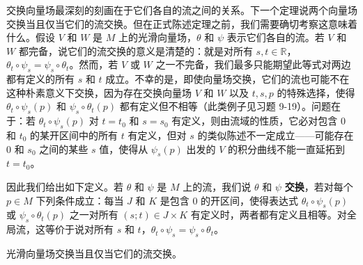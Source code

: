 \documentclass[../../main.tex]{subfiles}
\begin{document}
交换向量场最深刻的刻画在于它们各自的流之间的关系。下一个定理说两个向量场交换当且仅当它们的流交换。但在正式陈述定理之前，我们需要确切考察这意味着什么。假设 $V$ 和 $W$ 是 $M$ 上的光滑向量场，$\theta$ 和 $\psi$ 表示它们各自的流。若 $V$ 和 $W$ 都完备，说它们的流交换的意义是清楚的：就是对所有 $s,t\in\mathbb{R}$，$\theta_t\circ\psi_s=\psi_s\circ\theta_t$。然而，若 $V$ 或 $W$ 之一不完备，我们最多只能期望此等式对两边都有定义的所有 $s$ 和 $t$ 成立。不幸的是，即使向量场交换，它们的流也可能不在这种朴素意义下交换，因为存在交换向量场 $V$ 和 $W$ 以及 $t,s,p$ 的特殊选择，使得 $\theta_t\circ\psi_s(p)$ 和 $\psi_s\circ\theta_t(p)$ 都有定义但不相等（此类例子见习题 9-19）。问题在于：若 $\theta_t\circ\psi_s(p)$ 对 $t=t_0$ 和 $s=s_0$ 有定义，则由流域的性质，它必对包含 $0$ 和 $t_0$ 的某开区间中的所有 $t$ 有定义，但对 $s$ 的类似陈述不一定成立——可能存在 $0$ 和 $s_0$ 之间的某些 $s$ 值，使得从 $\psi_s(p)$ 出发的 $V$ 的积分曲线不能一直延拓到 $t=t_0$。

因此我们给出如下定义。若 $\theta$ 和 $\psi$ 是 $M$ 上的流，我们说 $\theta$ 和 $\psi$ \textbf{交换}，若对每个 $p\in M$ 下列条件成立：每当 $J$ 和 $K$ 是包含 $0$ 的开区间，使得表达式 $\theta_t\circ\psi_s(p)$ 或 $\psi_s\circ\theta_t(p)$ 之一对所有 $(s;t)\in J\times K$ 有定义时，两者都有定义且相等。对全局流，这等价于说对所有 $s$ 和 $t$，$\theta_t\circ\psi_s=\psi_s\circ\theta_t$。

\begin{theorem}\label{theorem:ch09-44}
光滑向量场交换当且仅当它们的流交换。
\end{theorem}
\end{document}
